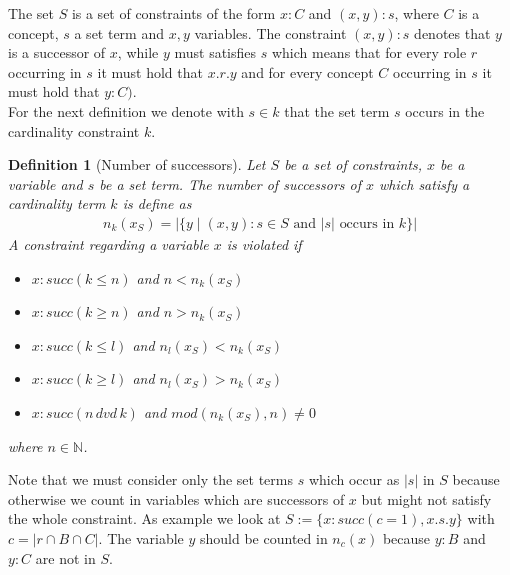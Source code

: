 \documentclass[a4paper,11pt]{scrartcl}
\theoremstyle{break}
\newtheorem{mydef}{Definition}
\begin{document}
The set $S$ is a set of constraints of the form $x:C$ and $(x,y):s$, where $C$ is a concept, $s$ a set term and $x,y$ variables. The constraint $(x,y):s$ denotes that $y$ is a successor of $x$, while $y$ must satisfies $s$ which means that for every role $r$ occurring in $s$ it must hold that $x.r.y$ and for every concept $C$ occurring in $s$ it must hold that $y:C)$.\\
For the next definition we denote with $s\in k$ that the set term $s$ occurs in the cardinality constraint $k$.
\begin{mydef}[Number of successors]
Let $S$ be a set of constraints, $x$ be a variable and $s$ be a set term. The number of successors of $x$ which satisfy a cardinality term $k$ is define as
\begin{align*}
n_k(x_S) = |\{y\mid (x,y):s\in S\text{ and }|s|\text{ occurs in }k\}|
\end{align*}
A constraint regarding a variable $x$ is \textit{violated} if
\begin{itemize}
\item $x:succ(k\leq n)$ and $n<n_k(x_S)$
\item $x:succ(k\geq n)$ and $n>n_k(x_S)$
\item $x:succ(k\leq l)$ and $n_l(x_S)<n_k(x_S)$
\item $x:succ(k\geq l)$ and $n_l(x_S)>n_k(x_S)$
\item $x:succ(n\,dvd\,k)$ and $mod(n_k(x_S),n)\neq 0$
\end{itemize} 
where $n\in\mathbb{N}$.
\end{mydef}
Note that we must consider only the set terms $s$ which occur as $|s|$ in $S$ because otherwise we count in variables which are successors of $x$ but might not satisfy the whole constraint. As example we look at $S:=\{x:succ(c=1), x.s.y\}$ with $c=|r\cap B\cap C|$. The variable $y$ should be counted in $n_c(x)$ because $y:B$ and $y:C$ are not in $S$.
\end{document}
